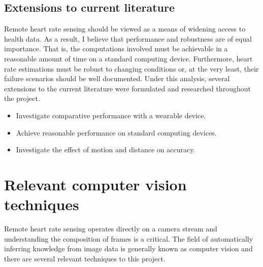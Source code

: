 \subsection{Extensions to current literature}
Remote heart rate sensing should be viewed as a means of widening access to health data.
As a result, I believe that
performance and robustness are of equal importance. That is, the computations involved must be achievable in a reasonable amount of time on a standard computing device.
Furthermore, heart rate estimations must be robust to changing conditions or, at the very least, their failure scenarios should be well documented. 
Under this analysis, several extensions to the current literature were formulated and researched throughout the project.
\begin{itemize}
    \item Investigate comparative performance with a wearable device.
    \item Achieve reasonable performance on standard computing devices.
    \item Investigate the effect of motion and distance on accuracy.
\end{itemize}


\section{Relevant computer vision techniques}
Remote heart rate sensing operates directly on a camera stream and understanding the composition of frames is a critical. The field of automatically inferring knowledge from image data is generally known as computer vision and there are several relevant techniques to this project.

